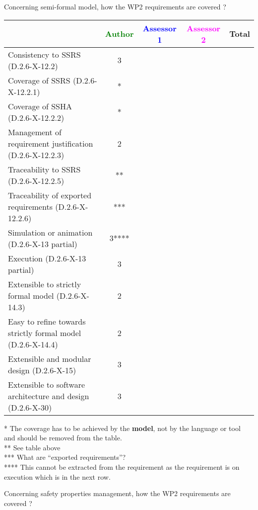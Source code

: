 Concerning semi-formal model, how the WP2 requirements are covered ?

\begin{tabular}{|l | c | c | c | c|}
\hline
& \textcolor{green}{Author} & \textcolor{blue}{Assessor 1} & \textcolor{magenta}{Assessor 2} & Total \\
\hline
Consistency to SSRS (D.2.6-X-12.2) &3 & & & \\
\hline
Coverage of SSRS (D.2.6-X-12.2.1) &* & & & \\
\hline
Coverage of SSHA (D.2.6-X-12.2.2) &* & & & \\
\hline
Management of requirement justification (D.2.6-X-12.2.3) &2 & & & \\
\hline
Traceability to SSRS (D.2.6-X-12.2.5) &** & & & \\
\hline
Traceability of exported requirements (D.2.6-X-12.2.6) &*** & & & \\
\hline
Simulation or animation (D.2.6-X-13 partial) &3**** & & & \\
\hline
Execution (D.2.6-X-13 partial) &3 & & & \\
\hline
Extensible to strictly formal model (D.2.6-X-14.3) &2 & & & \\
\hline
Easy to refine towards strictly formal model (D.2.6-X-14.4) &2 & & & \\
\hline
Extensible and modular design (D.2.6-X-15) &3 & & & \\
\hline
Extensible to software architecture and design (D.2.6-X-30) &3 & & & \\
\hline
\end{tabular}

\begin{author_comment}
* The coverage has to be achieved by the \textbf{model}, not by the language or tool and should be removed from the table.\\
** See table above\\
*** What are ``exported requirements''?\\
**** This cannot be extracted from the requirement as the requirement is on execution which is in the next row.
\end{author_comment}

Concerning safety properties management, how the WP2 requirements are covered ?


